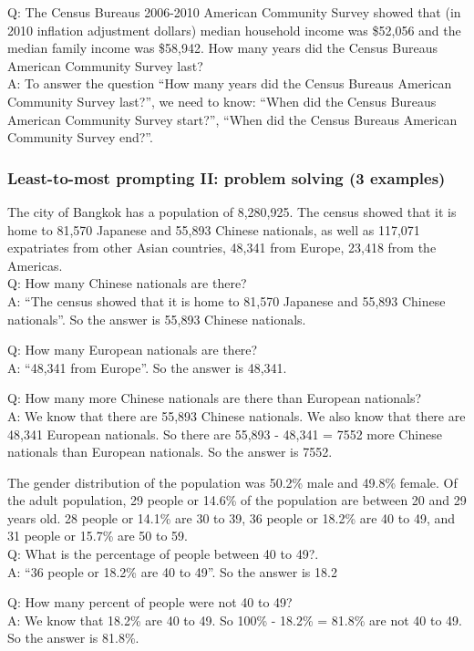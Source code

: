 Q: The Census Bureaus 2006-2010 American Community Survey showed that (in 2010 inflation adjustment dollars) median household income was \$52,056 and the median family income was \$58,942. How many years did the Census Bureaus American Community Survey last?\\
A: To answer the question ``How many years did the Census Bureaus American Community Survey last?'', we need to know: ``When did the Census Bureaus American Community Survey start?'', ``When did the Census Bureaus American Community Survey end?''.

\subsubsection{Least-to-most prompting II: problem solving (3 examples)}

The city of Bangkok has a population of 8,280,925. The census showed that it is home to 81,570 Japanese and 55,893 Chinese nationals, as well as 117,071 expatriates from other Asian countries, 48,341 from Europe, 23,418 from the Americas.\\
Q: How many Chinese nationals are there?\\
A: ``The census showed that it is home to 81,570 Japanese and 55,893 Chinese nationals''. So the answer is 55,893 Chinese nationals.

Q: How many European nationals are there?\\
A: ``48,341 from Europe''. So the answer is 48,341.

Q: How many more Chinese nationals are there than European nationals?\\
A: We know that there are 55,893 Chinese nationals. We also know that there are 48,341 European nationals. So there are 55,893 -  48,341 = 7552 more Chinese nationals than European nationals. So the answer is 7552.

The gender distribution of the population was 50.2\% male and 49.8\% female. Of the adult population, 29 people or 14.6\% of the population are between 20 and 29 years old.  28 people or 14.1\% are 30 to 39, 36 people or 18.2\% are 40 to 49, and 31 people or 15.7\% are 50 to 59.\\
Q: What is the percentage of people between 40 to 49?.\\
A: ``36 people or 18.2\% are 40 to 49''. So the answer is 18.2%

Q: How many percent of people were not 40 to 49?\\
A: We know that 18.2\% are 40 to 49. So 100\% - 18.2\% = 81.8\% are not 40 to 49. So the answer is 81.8\%.

